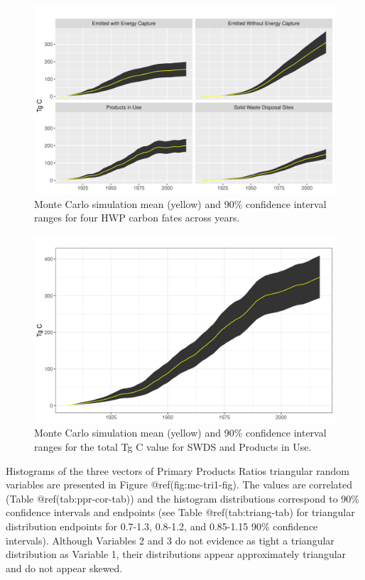 \documentclass[
  openany]{book}
\begin{document}
\begin{figure}
\includegraphics[width=1\linewidth]{images/MC_all4} \caption{Monte Carlo simulation mean (yellow) and 90\% confidence interval ranges for four HWP carbon fates across years.}\label{fig:mc-all4-fig}
\end{figure}

\begin{figure}
\includegraphics[width=1\linewidth]{images/MC_piu_swds} \caption{Monte Carlo simulation mean (yellow) and 90\% confidence interval ranges for the total Tg C value for SWDS and Products in Use.}\label{fig:mc-piu-swds-fig}
\end{figure}

Histograms of the three vectors of Primary Products Ratios triangular
random variables are presented in Figure @ref(fig:mc-tri1-fig). The
values are correlated (Table @ref(tab:ppr-cor-tab)) and the histogram
distributions correspond to 90\% confidence intervals and endpoints (see
Table @ref(tab:triang-tab) for triangular distribution endpoints for
0.7-1.3, 0.8-1.2, and 0.85-1.15 90\% confidence intervals). Although
Variables 2 and 3 do not evidence as tight a triangular distribution as
Variable 1, their distributions appear approximately triangular and do
not appear skewed.
\end{document}
